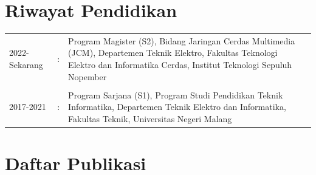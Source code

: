 \section*{Riwayat Pendidikan}
\begin{tabular}{p{3cm}cp{9cm}}
	2022-Sekarang  	& :&
		Program Magister (S2), Bidang Jaringan Cerdas
		Multimedia (JCM), Departemen Teknik Elektro,
		Fakultas Teknologi Elektro dan Informatika Cerdas, Institut Teknologi Sepuluh Nopember\\
	&&\\
	2017-2021  & :&
		Program Sarjana (S1), Program Studi Pendidikan Teknik Informatika, Departemen Teknik  Elektro dan Informatika, Fakultas Teknik, Universitas Negeri Malang\\
\end{tabular}


\section*{Daftar Publikasi}

